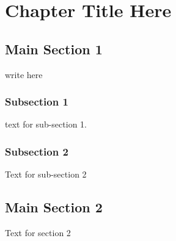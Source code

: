 
\chapter{Chapter Title Here} %

\label{ChapterX} %


\section{Main Section 1}
write here


\subsection{Subsection 1}
text for  sub-section 1. 


\subsection{Subsection 2}

Text for sub-section 2


\section{Main Section 2}

Text for section 2
